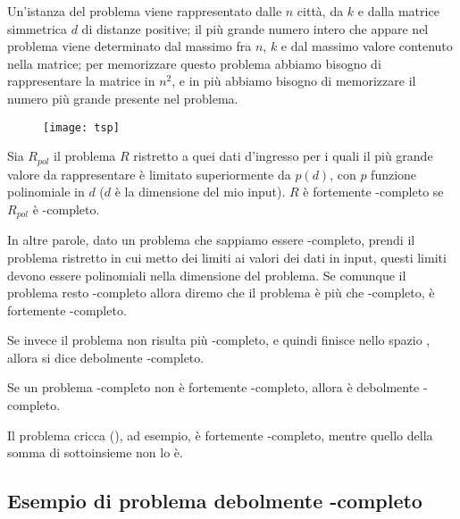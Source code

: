 \begin{minipage}[c]{.7\textwidth}
Un'istanza del problema {\tsp} viene rappresentato dalle \(n\) città, da \(k\) e dalla matrice simmetrica \(d\) di distanze positive;
il più grande numero intero che appare nel problema viene determinato dal massimo fra \(n\), \(k\) e dal massimo valore contenuto nella matrice;
per memorizzare questo problema abbiamo bisogno di rappresentare la matrice in \(n^2\), e in più abbiamo bisogno di memorizzare il numero più grande presente nel problema.
\end{minipage}%
\begin{minipage}[c]{.3\textwidth}
\begin{figure}[H]\centering
	\texttt{[image: tsp]}
\end{figure}
\end{minipage}

\begin{definition}
Sia \(R_{\mathit{pol}}\) il problema \(R\) ristretto a quei dati d'ingresso per i quali il più grande valore da rappresentare è limitato superiormente da \(p(d)\), con \(p\) funzione polinomiale in \(d\) (\(d\) è la dimensione del mio input).
\(R\) è \alert{fortemente \NP-completo} se \(R_{\mathit{pol}}\) è \NP-completo.
\end{definition}

In altre parole, dato un problema che sappiamo essere \NP-completo, prendi il problema ristretto in cui metto dei limiti ai valori dei dati in input, questi limiti devono essere polinomiali nella dimensione del problema.
Se comunque il problema resto \NP-completo allora diremo che il problema è più che \NP-completo, è fortemente \NP-completo.

Se invece il problema non risulta più \NP-completo, e quindi finisce nello spazio {\PTIME}, allora si dice debolmente \NP-completo.

\begin{definition}
Se un problema \NP-completo non è fortemente \NP-completo, allora è \alert{debolmente \NP-completo}.
\end{definition}

\begin{observation}
Il problema cricca ({\cliqueProblem}), ad esempio, è fortemente \NP-completo, mentre quello della somma di sottoinsieme {\subSetSumProblem} non lo è.
\end{observation}

\subsection{Esempio di problema debolmente \NP-completo}

